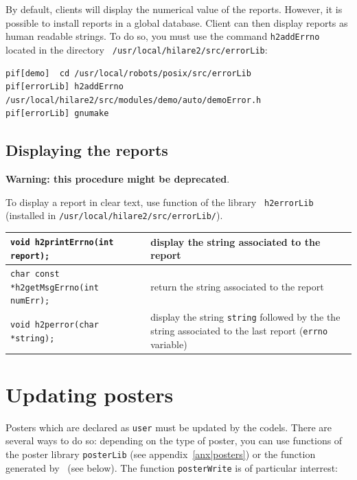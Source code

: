 By default, clients  will  display the  numerical value of  the  reports.
However, it is  possible to install  reports in a global database. Client
can then display  reports as human  readable strings. To  do so, you must
use  the command  {\tt    h2addErrno}  located in   the   directory  {\tt
/usr/local/hilare2/src/errorLib}:

\begin{center}\begin{cartouche}\small\begin{verbatim}
pif[demo]  cd /usr/local/robots/posix/src/errorLib
pif[errorLib] h2addErrno /usr/local/hilare2/src/modules/demo/auto/demoError.h
pif[errorLib] gnumake
\end{verbatim}\end{cartouche}\end{center}


\subsection{Displaying the reports}

{\bf Warning: this procedure might be deprecated}.

To  display a  report  in clear text,  use  function of  the library {\tt
h2errorLib} (installed in {\tt /usr/local/hilare2/src/errorLib/}).

\begin{center}\begin{tabularx}{\linewidth}{|lX|}
\hline
\tt void h2printErrno(int report); & display the string associated to the
report \\
\hline
\tt char const *h2getMsgErrno(int numErr); & return the string associated
to the report \\
\hline
\tt void h2perror(char *string);  & display the string {\tt string}
followed by the  the string associated to  the  last report ({\tt  errno}
variable)\\
\hline
\end{tabularx}\end{center}


\section{Updating posters}

Posters which are  declared as {\tt user}  must be updated by the codels.
There are several ways to do so: depending on the type of poster, you can
use  functions of    the      poster  library {\tt   posterLib}      (see
appendix~\ref{anx|posters}) or   the function  generated by \GenoM\  (see
below).  The function {\tt posterWrite} is of particular interrest:

